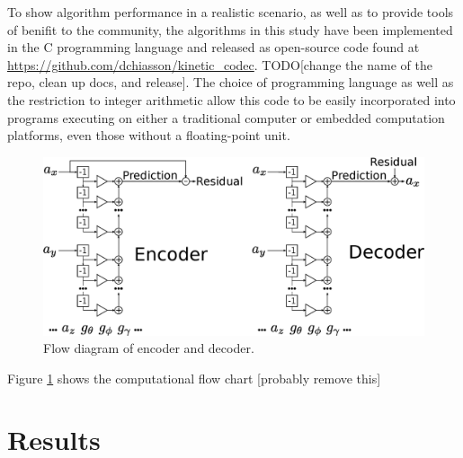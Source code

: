 \documentclass[journal]{IEEEtran}
\begin{document}
To show algorithm performance in a realistic scenario, as well as to provide tools of benifit to the community, the algorithms in this study have been implemented in the C programming language and released as open-source code found at \url{https://github.com/dchiasson/kinetic_codec}. TODO[change the name of the repo, clean up docs, and release]. The choice of programming language as well as the restriction to integer arithmetic allow this code to be easily incorporated into programs executing on either a traditional computer or embedded computation platforms, even those without a floating-point unit.
\begin{figure}
  \includegraphics[width=\linewidth]{flow_diagram.eps}
  \caption{Flow diagram of encoder and decoder.}
  \label{fig:flow_diagram}
\end{figure}

Figure \ref{fig:flow_diagram} shows the computational flow chart [probably remove this]


\section{Results}
\end{document}
